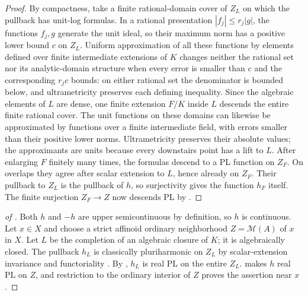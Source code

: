 \begin{proof}
By compactness, take a finite rational-domain cover of $Z_L$ on which the pullback has unit-log formulas. In a rational presentation $|f_j|\leq r_j|g|$, the functions $f_j,g$ generate the unit ideal, so their maximum norm has a positive lower bound $c$ on $Z_L$. Uniform approximation of all these functions by elements defined over finite intermediate extensions of $K$ changes neither the rational set nor its analytic-domain structure when every error is smaller than $c$ and the corresponding $r_jc$ bounds: on either rational set the denominator is bounded below, and ultrametricity preserves each defining inequality. Since the algebraic elements of $L$ are dense, one finite extension $F/K$ inside $L$ descends the entire finite rational cover. The unit functions on these domains can likewise be approximated by functions over a finite intermediate field, with errors smaller than their positive lower norms. Ultrametricity preserves their absolute values; the approximants are units because every downstairs point has a lift to $L$. After enlarging $F$ finitely many times, the formulas descend to a PL function on $Z_F$. On overlaps they agree after scalar extension to $L$, hence already on $Z_F$. Their pullback to $Z_L$ is the pullback of $h$, so surjectivity gives the function $h_F$ itself. The finite surjection $Z_F\to Z$ now descends PL by .
\end{proof}

\begin{proof}[of ]
Both $h$ and $-h$ are upper semicontinuous by definition, so $h$ is continuous. Let $x\in X$ and choose a strict affinoid ordinary neighborhood $Z=\mathcal M(A)$ of $x$ in $X$. Let $L$ be the completion of an algebraic closure of $K$; it is algebraically closed. The pullback $h_L$ is classically pluriharmonic on $Z_L$ by scalar-extension invariance and functoriality \cite[Proposition~7.2(6)--(7)]{GR25Classical}. By , $h_L$ is real PL on the entire $Z_L$.  makes $h$ real PL on $Z$, and restriction to the ordinary interior of $Z$ proves the assertion near $x$.
\end{proof}
